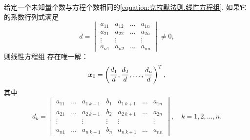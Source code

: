 \begin{theorem}[克拉默法则]\label{theorem:线性方程组.克拉默法则}
给定一个未知量个数与方程个数相同的\cref{equation:克拉默法则.线性方程组}.
如果它的系数行列式满足\[
	d
	=\begin{vmatrix}
		a_{11} & a_{12} & \dots & a_{1n} \\
		a_{21} & a_{22} & \dots & a_{2n} \\
		\vdots & \vdots & & \vdots \\
		a_{n1} & a_{n2} & \dots & a_{nn}
	\end{vmatrix}
	\neq 0,
\]
则线性方程组  存在唯一解：
\begin{equation}
	\boldsymbol{x}_0
	= \left( \frac{d_1}{d},\frac{d_2}{d},\dotsc,\frac{d_n}{d} \right)^T,
\end{equation}
其中\begin{equation}
	d_k
	= \begin{vmatrix}
		a_{11} & \dots & a_{1\ k-1} & b_1 & a_{1\ k+1} & \dots & a_{1n} \\
		a_{21} & \dots & a_{2\ k-1} & b_2 & a_{2\ k+1} & \dots & a_{2n} \\
		\vdots & & \vdots & \vdots & \vdots & & \vdots \\
		a_{n1} & \dots & a_{n\ k-1} & b_n & a_{n\ k+1} & \dots & a_{nn}
	\end{vmatrix},
	\quad k=1,2,\dotsc,n.
\end{equation}
\end{theorem}
